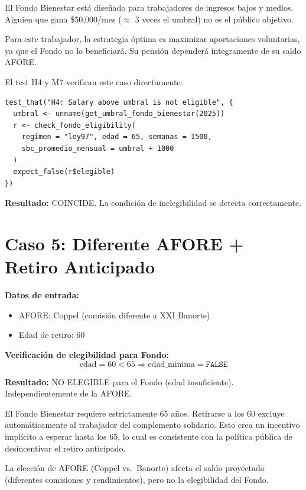 \documentclass[11pt,a4paper]{report}
\begin{document}
\begin{tcolorbox}[colback=green!5!white, colframe=green!50!black, title=\textbf{Intuici\'on}]
El Fondo Bienestar est\'a dise\~nado para trabajadores de ingresos bajos y medios. Alguien que gana \$50,000/mes ($\approx$ 3 veces el umbral) no es el p\'ublico objetivo.

Para este trabajador, la estrategia \'optima es maximizar aportaciones voluntarias, ya que el Fondo no lo beneficiar\'a. Su pensi\'on depender\'a \'integramente de su saldo AFORE.
\end{tcolorbox}

\begin{tcolorbox}[colback=orange!5!white, colframe=orange!75!black, title=\textbf{Aplicaci\'on en C\'odigo: Verificaci\'on}]
El test H4 y M7 verifican este caso directamente:

\begin{lstlisting}
test_that("H4: Salary above umbral is not eligible", {
  umbral <- unname(get_umbral_fondo_bienestar(2025))
  r <- check_fondo_eligibility(
    regimen = "ley97", edad = 65, semanas = 1500,
    sbc_promedio_mensual = umbral + 1000
  )
  expect_false(r$elegible)
})
\end{lstlisting}

\textbf{Resultado:} COINCIDE. La condici\'on de inelegibilidad se detecta correctamente.
\end{tcolorbox}


\section{Caso 5: Diferente AFORE + Retiro Anticipado}

\begin{tcolorbox}[colback=blue!5!white, colframe=blue!75!black, title=\textbf{Definici\'on Formal}]
\textbf{Datos de entrada:}
\begin{itemize}
  \item AFORE: Coppel (comisi\'on diferente a XXI Banorte)
  \item Edad de retiro: 60
\end{itemize}

\textbf{Verificaci\'on de elegibilidad para Fondo:}
\[
  \text{edad} = 60 < 65 \Rightarrow \text{edad\_minima} = \texttt{FALSE}
\]

\textbf{Resultado:} NO ELEGIBLE para el Fondo (edad insuficiente). Independientemente de la AFORE.
\end{tcolorbox}

\begin{tcolorbox}[colback=green!5!white, colframe=green!50!black, title=\textbf{Intuici\'on}]
El Fondo Bienestar requiere estrictamente 65 a\~nos. Retirarse a los 60 excluye autom\'aticamente al trabajador del complemento solidario. Esto crea un incentivo impl\'icito a esperar hasta los 65, lo cual es consistente con la pol\'itica p\'ublica de desincentivar el retiro anticipado.

La elecci\'on de AFORE (Coppel vs.\ Banorte) afecta el saldo proyectado (diferentes comisiones y rendimientos), pero no la elegibilidad del Fondo.
\end{tcolorbox}
\end{document}
